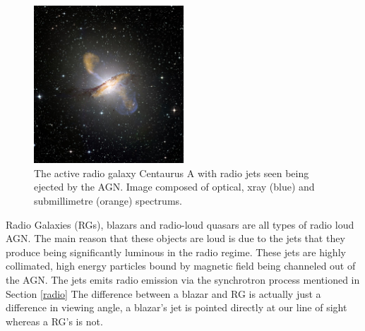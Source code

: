 \documentclass[10pt,a4paper]{article}
\begin{document}
\begin{figure}[H]
\begin{center}
	\includegraphics[width=0.5\textwidth]{CA}
	\caption{The active radio galaxy Centaurus A with radio jets seen being ejected by the AGN. Image composed of optical, xray (blue) and submillimetre (orange) spectrums\footnotemark.}
	\label{agn}
\end{center}
\end{figure}
Radio Galaxies (RGs), blazars and radio-loud quasars are all types of radio loud AGN. The main reason that these objects are loud is due to the jets that they produce being significantly luminous in the radio regime. These jets are highly collimated, high energy particles bound by magnetic field being channeled out of the AGN. The jets emits radio emission via the synchrotron process mentioned in Section \ref{radio} The difference between a blazar and RG is actually just a difference in viewing angle, a blazar's jet is pointed directly at our line of sight whereas a RG's is not.\\
\end{document}

